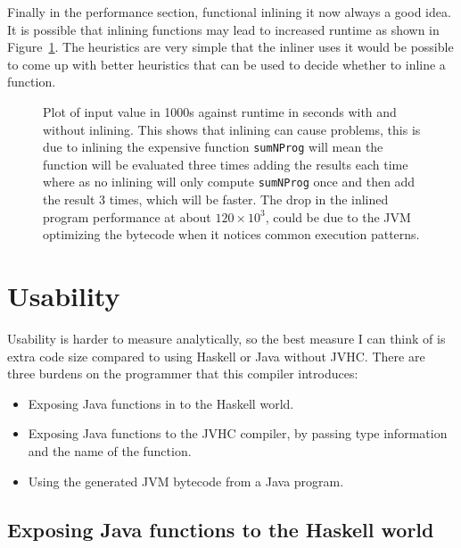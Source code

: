 \documentclass[float=false, crop=false]{standalone}
\newlength\gwidth
\newlength\gheight
\newcommand{\importMGraph}[3]{\setlength{\gwidth}{#2}\setlength{\gheight}{#3}{#1}}
\begin{document}
Finally in the performance section, functional inlining it now always a good idea.
It is possible that inlining functions may lead to increased runtime as shown in 
Figure~\ref{plot:badInline}. The heuristics are very simple
that the inliner uses it would be possible to come up with better heuristics that can be
used to decide whether to inline a function.

\begin{figure}
  \centering
  \importMGraph{plotBadInline}{0.96\textwidth}{0.3\textwidth}
  \caption[Plot of \texttt{badProg} as a function of $n$, to comparing inlined and non-inlined
  version of the compiled program]
  {Plot of input value in 1000s against runtime in seconds with and without inlining.
    This shows that inlining can cause problems, this is due to inlining the expensive function
    \texttt{sumNProg} will mean the function will be evaluated three times adding the results each time
    where as no inlining will only compute \texttt{sumNProg} once and then add the result 3 times, 
    which will be faster. The drop in the inlined program performance at about $120 \times 10^3$, 
    could be due to the JVM optimizing the bytecode when it notices common execution patterns.
    }
    \label{plot:badInline}
\end{figure}

\section{Usability}

Usability is harder to measure analytically, so the best measure I can think of is extra code size
compared to using Haskell or Java without JVHC.
There are three burdens on the programmer that this compiler introduces:
\begin{itemize}
  \item Exposing Java functions in to the Haskell world.
  \item Exposing Java functions to the JVHC compiler, by passing type information and the name 
    of the function.

  \item Using the generated JVM bytecode from a Java program.
\end{itemize}

\subsection{Exposing Java functions to the Haskell world}
\end{document}
